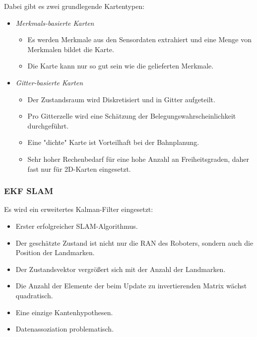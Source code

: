 \documentclass[a4paper, 11pt, accentcolor = tud3b]{tudreport}
\begin{document}
				Dabei gibt es zwei grundlegende Kartentypen:
				\begin{itemize}
					\item \emph{Merkmals-basierte Karten}
						\begin{itemize}
							\item Es werden Merkmale aus den Sensordaten extrahiert und eine Menge von Merkmalen bildet die Karte.
							\item Die Karte kann nur so gut sein wie die gelieferten Merkmale.
						\end{itemize}
					\item \emph{Gitter-basierte Karten}
						\begin{itemize}
							\item Der Zustandsraum wird Diskretisiert und in Gitter aufgeteilt.
							\item Pro Gitterzelle wird eine Schätzung der Belegungswahrscheinlichkeit durchgeführt.
							\item Eine "dichte" Karte ist Vorteilhaft bei der Bahnplanung.
							\item Sehr hoher Rechenbedarf für eine hohe Anzahl an Freiheitsgraden, daher fast nur für 2D-Karten eingesetzt.
						\end{itemize}
				\end{itemize}

				\subsubsection{EKF SLAM}
					Es wird ein erweitertes Kalman-Filter eingesetzt:
					\begin{itemize}
						\item Erster erfolgreicher SLAM-Algorithmus.
						\item Der geschätzte Zustand ist nicht nur die RAN des Roboters, sondern auch die Position der Landmarken.
						\item Der Zustandsvektor vergrößert sich mit der Anzahl der Landmarken.
						\item Die Anzahl der Elemente der beim Update zu invertierenden Matrix wächst quadratisch.
						\item Eine einzige Kantenhypothesen.
						\item Datenassoziation problematisch.
					\end{itemize}
				
\end{document}
